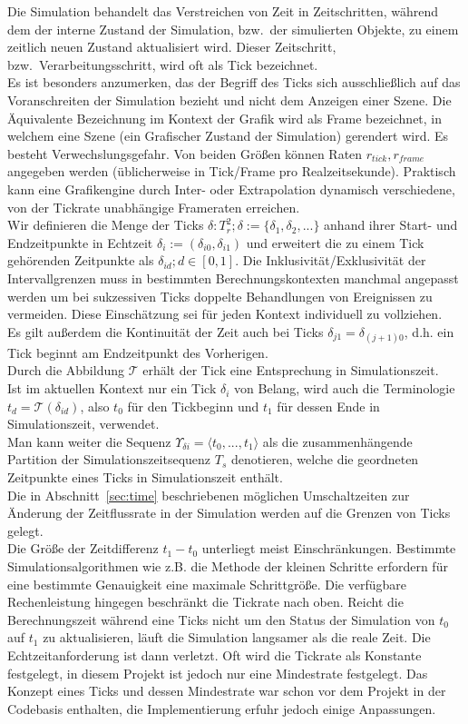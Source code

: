 
Die Simulation behandelt das Verstreichen von Zeit in Zeitschritten, während dem der interne Zustand der Simulation, bzw.~der simulierten Objekte, zu einem zeitlich neuen Zustand aktualisiert wird.
Dieser Zeitschritt, bzw.~Verarbeitungsschritt, wird oft als Tick bezeichnet.\\

Es ist besonders anzumerken, das der Begriff des Ticks sich ausschließlich auf das Voranschreiten der Simulation bezieht und nicht dem Anzeigen einer Szene. Die Äquivalente Bezeichnung im Kontext der Grafik wird als Frame bezeichnet, in welchem eine Szene (ein Grafischer Zustand der Simulation) gerendert wird. Es besteht Verwechslungsgefahr. Von beiden Größen können Raten $r_{tick}, r_{frame}$ angegeben werden (üblicherweise in Tick/Frame pro Realzeitsekunde). Praktisch kann eine Grafikengine durch Inter- oder Extrapolation dynamisch verschiedene, von der Tickrate unabhängige Frameraten erreichen.\\
Wir definieren die Menge der Ticks $\delta:T_r^2; \delta:=\{\delta_1, \delta_2, ...\}$ anhand ihrer Start- und Endzeitpunkte in Echtzeit $\delta_i := (\delta_{i0}, \delta_{i1})$ und erweitert die zu einem Tick gehörenden Zeitpunkte als $\delta_{id}; d \in [0,1]$. Die Inklusivität/Exklusivität der Intervallgrenzen muss in bestimmten Berechnungskontexten manchmal angepasst werden um bei sukzessiven Ticks doppelte Behandlungen von Ereignissen zu vermeiden. Diese Einschätzung sei für jeden Kontext individuell zu vollziehen.\\
Es gilt außerdem die Kontinuität der Zeit auch bei Ticks $\delta_{j1} = \delta_{(j+1)0}$, d.h. ein Tick beginnt am Endzeitpunkt des Vorherigen.\\
Durch die Abbildung $\mathcal{T}$ erhält der Tick eine Entsprechung in Simulationszeit.\\
Ist im aktuellen Kontext nur ein Tick $\delta_i$ von Belang, wird auch die Terminologie $t_d =\mathcal{T}(\delta_{id})$, also $t_0$ für den Tickbeginn und $t_1$ für dessen Ende in Simulationszeit, verwendet.\\
Man kann weiter die Sequenz $\Upsilon_{\delta i} = \langle t_0, ...,  t_1\rangle$ als die zusammenhängende Partition der Simulationszeitsequenz $T_s$ denotieren, welche die geordneten Zeitpunkte eines Ticks in Simulationszeit enthält.\\
Die in Abschnitt~\ref{sec:time} beschriebenen möglichen Umschaltzeiten zur Änderung der Zeitflussrate in der Simulation werden auf die Grenzen von Ticks gelegt.\\
Die Größe der Zeitdifferenz $t_1 - t_0$ unterliegt meist Einschränkungen. Bestimmte Simulationsalgorithmen wie z.B. die Methode der kleinen Schritte erfordern für eine bestimmte Genauigkeit eine maximale Schrittgröße. Die verfügbare Rechenleistung hingegen beschränkt die Tickrate nach oben. Reicht die Berechnungszeit während eine Ticks nicht um den Status der Simulation von $t_0$ auf $t_1$ zu aktualisieren, läuft die Simulation langsamer als die reale Zeit. Die Echtzeitanforderung ist dann verletzt. Oft wird die Tickrate als Konstante festgelegt, in diesem Projekt ist jedoch nur eine Mindestrate festgelegt. Das Konzept eines Ticks und dessen Mindestrate war schon vor dem Projekt in der Codebasis enthalten, die Implementierung erfuhr jedoch einige Anpassungen.
